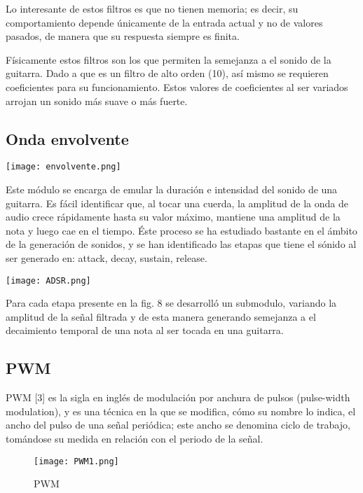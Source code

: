 \documentclass[12pt,journal]{IEEEtran}
\begin{document}
Lo interesante de estos filtros es que no tienen memoria; es decir, su comportamiento depende \'unicamente de la entrada actual y no de valores pasados, de manera que su respuesta siempre es finita.

F\'isicamente estos filtros son los que permiten la semejanza a el sonido de la guitarra. Dado a que es un filtro de alto orden (10), as\'i mismo se requieren coeficientes para su funcionamiento. Estos valores de coeficientes al ser variados arrojan un sonido m\'as suave o m\'as fuerte.
 \subsection*{Onda envolvente}
\begin{center}
	\texttt{[image: envolvente.png]}
\end{center}

Este m\'odulo se encarga de emular la duraci\'on e intensidad del sonido de una guitarra. Es fácil identificar que, al tocar una cuerda, la amplitud de la onda de audio crece r\'apidamente hasta su valor m\'aximo, mantiene una amplitud de la nota y luego cae en el tiempo. \'Este proceso se ha estudiado bastante en el \'ambito de la generaci\'on de sonidos, y se han identificado las etapas que tiene el s\'onido al ser generado en: attack, decay, sustain, release.
\begin{center}
	\texttt{[image: ADSR.png]}
\end{center}

Para cada etapa presente en la fig. 8 se desarroll\'o un submodulo, variando la amplitud de la señal filtrada y de esta manera generando semejanza a el decaimiento temporal de una nota al ser tocada en una guitarra.

\subsection*{PWM}
PWM [3] es la sigla en ingl\'es de modulaci\'on por anchura de pulsos (pulse-width modulation), y es una t\'ecnica en la que se modifica, c\'omo su nombre lo indica, el ancho del pulso de una señal peri\'odica; este ancho se denomina ciclo de trabajo, tom\'andose su medida en relaci\'on con el  periodo de la se\~nal.
\begin{figure}[h]
\centering
 \texttt{[image: PWM1.png]}
        \caption{PWM}
\end{figure}
\end{document}
